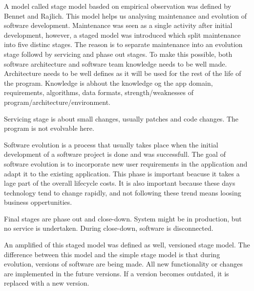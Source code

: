 A model called stage model basded on empirical observation was defined by Bennet and Rajlich. This model helps us analysing maintenance and evolution of software development. Maintenance was seen as a single activity after initial development, however, a staged model was introduced which split maintenance into five distinc stages. The reason is to separate maintenance into an evolution stage followd by servicing and phase out stages. To make this possible, both software architecture and software team knowledge needs to be well made. Architecture needs to be well defines as it will be used for the rest of the life of the program. Knowledge is abhout the knowledge og the app domain, requirements, algorithms, data formats, strength/weaknesses of program/architecture/environment.

Servicing stage is about small changes, usually patches and code changes. The program is not evolvable here. 

Software evolution is a process that usually takes place when the initial development of a software project is done and was successfull. The goal of software evolution is to incorporate new user requirements in the application and adapt it to the existing application. This phase is important beacuse it takes a lage part of the overall lifecycle costs. It is also important because these days technology tend to change rapidly, and not following these trend means loosing business oppertunities.

Final stages are phase out and close-down. System might be in production, but no service is undertaken. During close-down, software is disconnected. 

An amplified of this staged model was defined as well, versioned stage model. The difference between this model and the simple stage model is that during evolution, versions of software are being made. All new functionality or changes are implemented in the future versions. If a version becomes outdated, it is replaced with a new version.	







